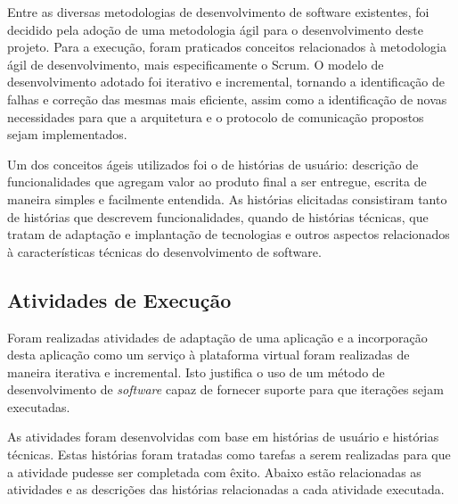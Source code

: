 Entre as diversas metodologias de desenvolvimento de software existentes, foi decidido pela adoção de uma metodologia ágil para o desenvolvimento deste projeto. Para a execução, foram praticados conceitos relacionados à metodologia ágil de desenvolvimento, mais especificamente o Scrum. O modelo de desenvolvimento adotado foi iterativo e incremental, tornando a identificação de falhas e correção das mesmas mais eficiente, assim como a identificação de novas necessidades para que a arquitetura e o protocolo de comunicação propostos sejam implementados.

Um dos conceitos ágeis utilizados foi o de histórias de usuário: descrição de funcionalidades que agregam valor ao produto final a ser entregue, escrita de maneira simples e facilmente entendida. As histórias elicitadas consistiram tanto de histórias que descrevem funcionalidades, quando de histórias técnicas, que tratam de adaptação e implantação de tecnologias e outros aspectos relacionados à características técnicas do desenvolvimento de software.

\subsection{Atividades de Execução}
Foram realizadas atividades de adaptação de uma aplicação e a incorporação desta aplicação como um serviço à plataforma virtual foram realizadas de maneira iterativa e incremental. Isto justifica o uso de um método de desenvolvimento de \textit{software} capaz de fornecer suporte para que iterações sejam executadas.

As atividades foram desenvolvidas com base em histórias de usuário e histórias técnicas. Estas histórias foram tratadas como tarefas a serem realizadas para que a atividade pudesse ser completada com êxito. Abaixo estão relacionadas as atividades e as descrições das histórias relacionadas a cada atividade executada.

